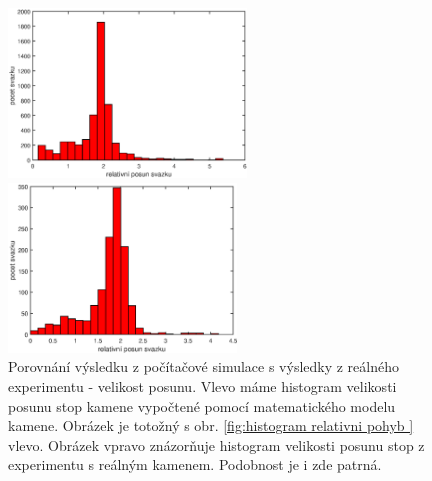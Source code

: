 \begin{figure}[h!]
 \begin{center}
 

   \begin{minipage}[c]{0.45\textwidth}
     \centering \includegraphics[height =4.5cm]{figures/relative} 
   \end{minipage}
   \begin{minipage}[c]{0.45\textwidth}
     \centering \includegraphics[height =4.5cm]{figures/real_relative} 
   \end{minipage}
 \end{center}

   \caption{Porovnání výsledku z počítačové simulace s výsledky z reálného experimentu - velikost posunu. Vlevo máme histogram velikosti posunu stop kamene  vypočtené pomocí matematického modelu kamene. Obrázek je totožný s obr. \ref{fig:histogram relativni pohyb } vlevo. Obrázek vpravo znázorňuje histogram velikosti posunu stop z experimentu s reálným kamenem. Podobnost je i zde patrná.}
  \label{fig:relativni posun porovnani}
 \end{figure}

  
